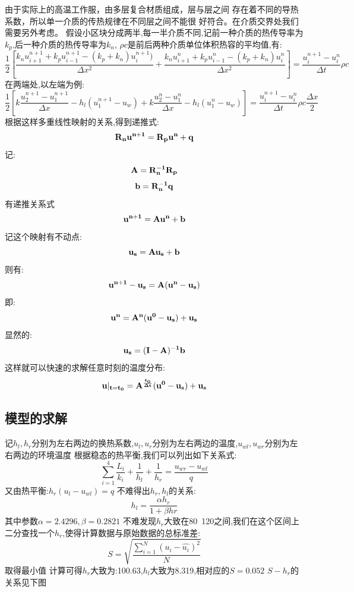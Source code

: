 \documentclass{cumcmthesis}
\begin{document}
    由于实际上的高温工作服，由多层复合材质组成，层与层之间
    存在着不同的导热系数，所以单一介质的传热规律在不同层之间不能很
    好符合。在介质交界处我们需要另外考虑。
    假设小区块分成两半,每一半介质不同,记前一种介质的热传导率为\(k_p\),后一种介质的热传导率为\(k_n\),
    \(\rho c\)是前后两种介质单位体积热容的平均值,有:
    \[
        \frac{1}{2}
        \left[
            \frac{k_n u_{i+1}^{n+1} + k_p u_{i-1}^{n+1} - (k_p+k_n)u_{i}^{n+1}) }{\Delta x^2}
            +
            \frac{k_n u_{i+1}^{n} + k_p u_{i-1}^{n} - (k_p+k_n)u_{i}^{n} }{\Delta x^2}
        \right]
        =
        \frac{ u_{i}^{n+1} - u_{i}^{n} }{\Delta t} \rho c
    \]
    在两端处,以左端为例:
    \[
        \frac{1}{2}
        \left[
            k\frac{ u_{2}^{n+1}  - u_{1}^{n+1} }{\Delta x}
            -
            h_l(u_{1}^{n+1} - u_w)
            +
            k\frac{ u_{2}^{n}  - u_{1}^{n} }{\Delta x}
            -
            h_l(u_{1}^{n} - u_w)
        \right]
        =
        \frac{ u_{i}^{n+1} - u_{i}^{n} }{\Delta t} \rho c \frac{\Delta x}{2}
    \]
    根据这样多重线性映射的关系,得到递推式:
    \[\bf{R_n}\bf{u}^{n+1} = \bf{R_p}\bf{u}^{n} + \bf{q}\]
    记:
    \[\bf{A} = \bf{R}_n^{-1}\bf{R}_p\]
    \[\bf{b} = \bf{R}_n^{-1}\bf{q}\]
    有递推关系式
    \[\bf{u}^{n+1} = \bf{A}\bf{u}^{n} + \bf{b}\]
    记这个映射有不动点:
    \[\bf{u}_s = \bf{A}\bf{u}_s + \bf{b}\]
    则有:
    \[ \bf{u}^{n+1} - \bf{u}_s = \bf{A} (\bf{u}^n - \bf{u}_s) \]
    即:
    \[\bf{u}^{n} = \bf{A}^n (\bf{u}^0 - \bf{u}_s) + \bf{u}_s\]
    显然的:
    \[\bf{u}_s = (\bf{I} - \bf{A})^{-1}\bf{b}\]
    这样就可以快速的求解任意时刻的温度分布:
    \[\bf{u}|_{t = t_0} = \bf{A}^{\frac{t_0}{\Delta t}} (\bf{u}^0 - \bf{u}_s) + \bf{u}_s\]

        \subsection{模型的求解}
    记\(h_l,h_r\)分别为左右两边的换热系数,\(u_l,u_r\)分别为左右两边的温度,\(u_{wl},u_{wr}\)分别为左右两边的环境温度
    根据稳态的热平衡,我们可以列出如下关系式:
    \[\sum_{i=1}^4 \frac{L_i}{k_i} + \frac{1}{h_l} + \frac{1}{h_r} = \frac{u_{wr}-u_{wl}}{q}\]
    又由热平衡:\( h_r(u_l-u_{wl}) = q\)
    不难得出\(h_r,h_l\)的关系:
    \[h_l = \frac{\alpha h_r}{1+\beta hr}\]
    其中参数\(\alpha = 2.4296 ,\beta = 0.2821\)
    不难发现\(h_r\)大致在80~120之间,我们在这个区间上二分查找一个\(h_r\),使得计算数据与原始数据的总标准差:
    \[S = \sqrt{\frac{\sum_{i=1}^{N}(u_i-\hat{u_i})^2}{N}}\]
    取得最小值
    计算可得\(h_r\)大致为:100.63,\(h_l\)大致为8.319,相对应的\(S = 0.052\)
    \(S-h_r\)的关系见下图    
\end{document}
